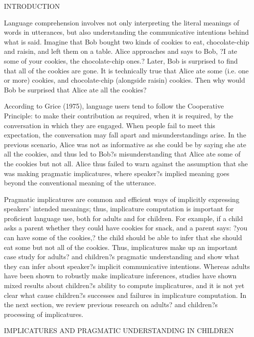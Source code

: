 INTRODUCTION

Language comprehension involves not only interpreting the literal meanings of words in utterances, but also understanding the communicative intentions behind what is said. Imagine that Bob bought two kinds of cookies to eat, chocolate-chip and raisin, and left them on a table. Alice approaches and says to Bob, ?I ate some of your cookies, the chocolate-chip ones.? Later, Bob is surprised to find that all of the cookies are gone. It is technically true that Alice ate some (i.e. one or more) cookies, and chocolate-chip (alongside raisin) cookies. Then why would Bob be surprised that Alice ate all the cookies?

According to Grice (1975), language users tend to follow the Cooperative Principle: to make their contribution as required, when it is required, by the conversation in which they are engaged. When people fail to meet this expectation, the conversation may fall apart and misunderstandings arise. In the previous scenario, Alice was not as informative as she could be by saying she ate all the cookies, and thus led to Bob?s misunderstanding that Alice ate some of the cookies but not all. Alice thus failed to warn against the assumption that she was making pragmatic implicatures, where speaker?s implied meaning goes beyond the conventional meaning of the utterance.

Pragmatic implicatures are common and efficient ways of implicitly expressing speakers' intended meanings; thus, implicature computation is important for proficient language use, both for adults and for children. For example, if a child asks a parent whether they could have cookies for snack, and a parent says: ?you can have some of the cookies,? the child should be able to infer that she should eat some but not all of the cookies. Thus, implicatures make up an important case study for adults? and children?s pragmatic understanding and show what they can infer about speaker?s implicit communicative intentions. Whereas adults have been shown to robustly make implicature inferences, studies have shown mixed results about children?s ability to compute implicatures, and it is not yet clear what cause children?s successes and failures in implicature computation. In the next section, we review previous research on adults? and children?s processing of implicatures.

IMPLICATURES AND PRAGMATIC UNDERSTANDING IN CHILDREN

